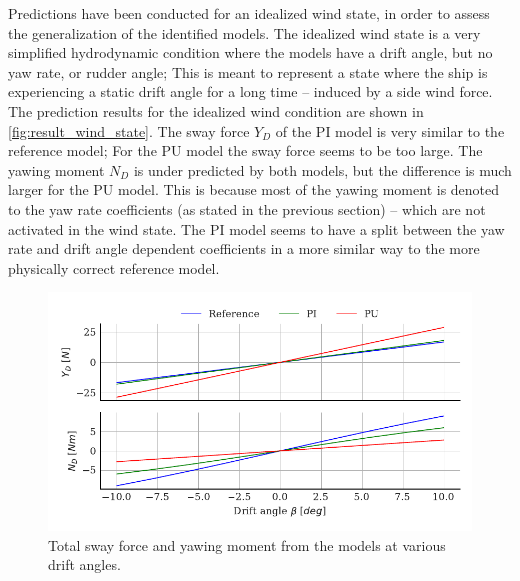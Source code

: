 Predictions have been conducted for an idealized wind state, in order to assess the generalization of the  identified models. The idealized wind state is a very simplified hydrodynamic condition where the models have a drift angle, but no yaw rate, or rudder angle; This is meant to represent a state where the ship is experiencing a static drift angle for a long time -- induced by a side wind force.
The prediction results for the idealized wind condition are shown in \autoref{fig:result_wind_state}. The sway force $Y_D$ of the PI model is very similar to the reference model; For the PU model the sway force seems to be too large. The yawing moment $N_D$ is under predicted by both models, but the difference is much larger for the PU model. 
This is because most of the yawing moment is denoted to the yaw rate coefficients (as stated in the previous section) -- which are not activated in the wind state. 
The PI model seems to have a split between the yaw rate and drift angle dependent coefficients in a more similar way to the more physically correct reference model.
\label{sec:wind_state}
\begin{figure}[h!]
    \includegraphics{figures/result_wind_state.forces.pdf}
    \caption{Total sway force and yawing moment from the models at various drift angles.}
    \label{fig:result_wind_state}
\end{figure}